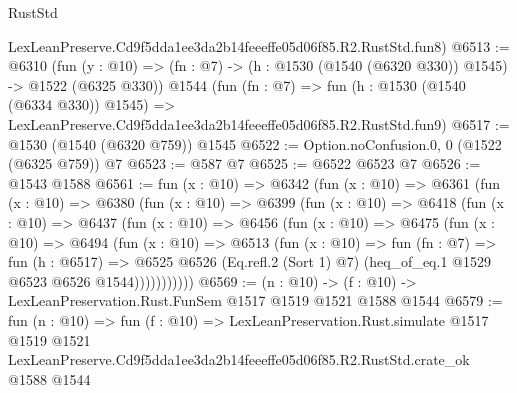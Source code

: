 \begin{lexlean}{RustStd}
\begin{coremodule}
    LexLeanPreserve.Cd9f5dda1ee3da2b14feeeffe05d06f85.R2.RustStd.fun8)
@6513 := @6310
    (fun (y : @10) => (fn : @7) -> (h : @1530 (@1540 (@6320 @330)) @1545) -> @1522 (@6325 @330))
    @1544
    (fun (fn : @7) =>
    fun (h : @1530 (@1540 (@6334 @330)) @1545) =>
    LexLeanPreserve.Cd9f5dda1ee3da2b14feeeffe05d06f85.R2.RustStd.fun9)
@6517 := @1530 (@1540 (@6320 @759)) @1545
@6522 := Option.noConfusion.{0, 0} (@1522 (@6325 @759)) @7
@6523 := @587 @7
@6525 := @6522 @6523 @7
@6526 := @1543 @1588
@6561 := fun (x : @10) =>
  @6342
    (fun (x : @10) =>
    @6361
      (fun (x : @10) =>
      @6380
        (fun (x : @10) =>
        @6399
          (fun (x : @10) =>
          @6418
            (fun (x : @10) =>
            @6437
              (fun (x : @10) =>
              @6456
                (fun (x : @10) =>
                @6475
                  (fun (x : @10) =>
                  @6494
                    (fun (x : @10) =>
                    @6513
                      (fun (x : @10) =>
                      fun (fn : @7) =>
                      fun (h : @6517) =>
                      @6525
                        @6526
                        (Eq.refl.{2} (Sort 1) @7)
                        (heq_of_eq.{1} @1529 @6523 @6526 @1544)))))))))))
@6569 := (n : @10) -> (f : @10) -> LexLeanPreservation.Rust.FunSem @1517 @1519 @1521 @1588 @1544
@6579 := fun (n : @10) =>
  fun (f : @10) =>
  LexLeanPreservation.Rust.simulate
    @1517
    @1519
    @1521
    LexLeanPreserve.Cd9f5dda1ee3da2b14feeeffe05d06f85.R2.RustStd.crate_ok
    @1588
    @1544
\end{coremodule}
\end{lexlean}

